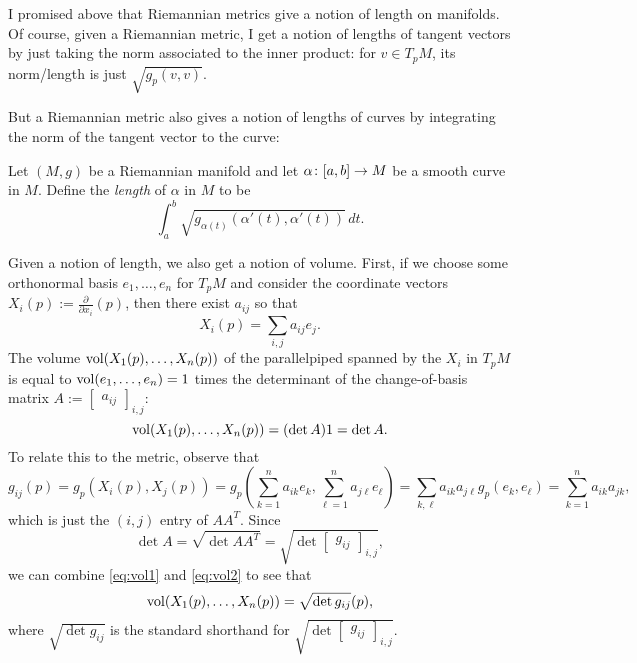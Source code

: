 I promised above that Riemannian metrics give a notion of length on manifolds. Of course, given a Riemannian metric, I get a notion of lengths of tangent vectors by just taking the norm associated to the inner product: for $v \in T_p M$, its norm/length is just $\sqrt{g_p(v,v)}$.

But a Riemannian metric also gives a notion of lengths of curves by integrating the norm of the tangent vector to the curve:

\begin{definition}\label{def:lengths of curves}
	Let $(M,g)$ be a Riemannian manifold and let $\alpha \colon\thinspace\! [a,b] \to M$ be a smooth curve in $M$. Define the \emph{length} of $\alpha$ in $M$ to be
	\[
		\int_a^b \sqrt{g_{\alpha(t)}(\alpha'(t),\alpha'(t))}\, dt.
	\]
\end{definition}

Given a notion of length, we also get a notion of volume. First, if we choose some orthonormal basis $e_1, \dots , e_n$ for $T_p M$ and consider the coordinate vectors $X_i(p) := \frac{\partial}{\partial x_i}(p)$, then there exist $a_{ij}$ so that
\[
	X_i(p) = \sum_{i,j} a_{ij} e_j.
\]
The volume $\operatorname{vol}(X_1(p), \dots , X_n(p))$ of the parallelpiped spanned by the $X_i$ in $T_pM$ is equal to $\operatorname{vol}(e_1, \dots , e_n) = 1$ times the determinant of the change-of-basis matrix $A := \begin{bmatrix}a_{ij} \end{bmatrix}_{i,j}$:
\begin{equation}\label{eq:vol1}
	\operatorname{vol}(X_1(p), \dots , X_n(p)) = (\det A) 1 = \det A.
\end{equation}
To relate this to the metric, observe that
\[
	g_{ij}(p) = g_p(X_i(p),X_j(p)) = g_p \left(\sum_{k=1}^n a_{ik}e_k, \sum_{\ell=1}^n a_{j\ell}e_\ell\right) = \sum_{k,\ell} a_{ik}a_{j\ell} g_p(e_k,e_\ell) = \sum_{k=1}^n a_{ik}a_{jk},
\]
which is just the $(i,j)$ entry of $AA^T$. Since 
\begin{equation}\label{eq:vol2}
	\det A = \sqrt{\det AA^T} = \sqrt{\det \begin{bmatrix} g_{ij} \end{bmatrix}_{i,j}},
\end{equation}
we can combine \eqref{eq:vol1} and \eqref{eq:vol2} to see that
\[
	\operatorname{vol}(X_1(p), \dots , X_n(p)) = \sqrt{\det g_{ij}}(p),
\]
where $\sqrt{\det g_{ij}}$ is the standard shorthand for $\sqrt{\det \begin{bmatrix} g_{ij} \end{bmatrix}_{i,j}}$.


